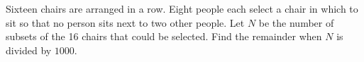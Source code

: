 Sixteen chairs are arranged in a row. Eight people each select a chair in which to sit so that no person sits next to two other people. Let $N$ be the number of subsets of the 16 chairs that could be selected. Find the remainder when $N$ is divided by $1000$.